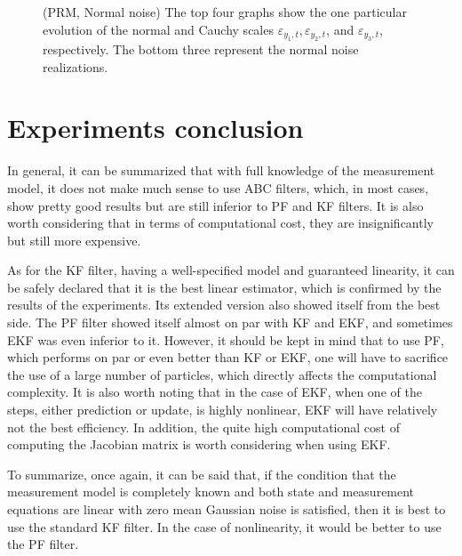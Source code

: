 \begin{figure}[!ht]
\centering
\caption{(PRM, Normal noise) The top four graphs show the one particular evolution of the normal and Cauchy scales \(\varepsilon_{y_1,t}, \varepsilon_{y_2,t}\), and \(\varepsilon_{y_3,t}\), respectively. The bottom three represent the normal noise realizations.}
\label{fig:prm_abc_scales_evolution_normal}
\end{figure}

\section{Experiments conclusion}
In general, it can be summarized that with full knowledge of the measurement model, it does not make much sense to use ABC filters, which, in most cases, show pretty good results but are still inferior to PF and KF filters. It is also worth considering that in terms of computational cost, they are insignificantly but still more expensive.

As for the KF filter, having a well-specified model and guaranteed linearity, it can be safely declared that it is the best linear estimator, which is confirmed by the results of the experiments. Its extended version also showed itself from the best side. The PF filter showed itself almost on par with KF and EKF, and sometimes EKF was even inferior to it. However, it should be kept in mind that to use PF, which performs on par or even better than KF or EKF, one will have to sacrifice the use of a large number of particles, which directly affects the computational complexity. It is also worth noting that in the case of EKF, when one of the steps, either prediction or update, is highly nonlinear, EKF will have relatively not the best efficiency. In addition, the quite high computational cost of computing the Jacobian matrix is worth considering when using EKF.

To summarize, once again, it can be said that, if the condition that the measurement model is completely known and both state and measurement equations are linear with zero mean Gaussian noise is satisfied, then it is best to use the standard KF filter. In the case of nonlinearity, it would be better to use the PF filter.